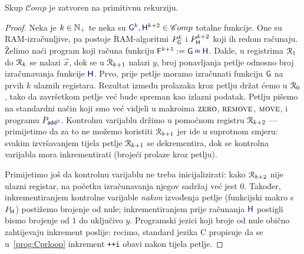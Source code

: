 \begin{lema}[{name=[zatvorenost skupa $\mathscr Comp$ na primitivnu rekurziju]}]\label{lm:prram}
Skup $\mathscr Comp$ je zatvoren na primitivnu rekurziju.
\end{lema}
\begin{proof}
Neka je $k\in{\mathbb N}_+$ te neka su $\f G^k,\f H^{k+2}\in\mathscr Comp$ totalne funkcije. One su RAM-izračunljive, pa postoje RAM-algoritmi $P_{\f G}^k$ i $P_{\f H}^{k+2}$ koji ih redom računaju. Želimo naći program koji računa funkciju $\f F^{k+1}:=\f G\pr\f H$. Dakle, u registrima $\mathcal R_{1}$ do $\mathcal R_{k}$ se nalazi $\vec x$, dok se u $\mathcal R_{k+1}$ nalazi $y$, broj ponavljanja petlje odnosno broj izračunavanja funkcije $\f H$. Prvo, prije petlje moramo izračunati funkciju $\f G$ na prvih $k$ ulaznih registara. Rezultat između prolazaka kroz petlju držat ćemo u $\mathcal R_{0}$, tako da završetkom petlje već bude spreman kao izlazni podatak. Petlju pišemo na standardni način koji smo već vidjeli u makroima $\textsc{zero}$, $\textsc{remove}$, $\textsc{move}$, i programu $P_{\f{add}^3}$. Kontrolnu varijablu držimo u pomoćnom registru $\mathcal R_{k+2}$ --- primijetimo da za to ne možemo koristiti $\mathcal R_{k+1}$ jer ide u suprotnom smjeru: svakim izvršavanjem tijela petlje $\mathcal R_{k+1}$ se dekrementira, dok se kontrolna varijabla mora inkrementirati (brojeći prolaze kroz petlju).

    Primijetimo još da kontrolnu varijablu ne treba inicijalizirati: kako $\mathcal R_{k+2}$ nije ulazni registar, na početku izračunavanja njegov sadržaj već jest $0$. Također, inkrementiranjem kontrolne varijable \emph{nakon} izvođenja petlje (funkcijski makro s $P_{\f H}$) postižemo brojenje od nule; inkrementiranjem prije računanja $\f H$ postigli bismo brojenje od $1$ do uključivo $y$. Programski jezici koji broje od nule obično zahtijevaju inkrement poslije: recimo, standard jezika C propisuje da se u~\eqref{prog:Cprloop} inkrement \texttt{++i} obavi nakon tijela petlje.


\end{proof}
